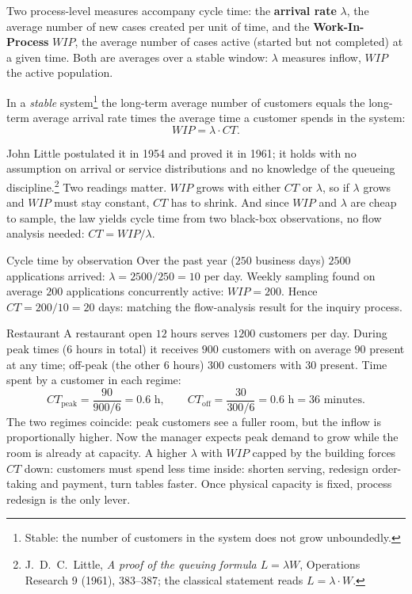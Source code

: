 Two process-level measures accompany cycle time: the \textbf{arrival rate} $\lambda$, the average number of new cases created per unit of time, and the \textbf{Work-In-Process} $WIP$, the average number of cases active (started but not completed) at a given time. Both are averages over a stable window: $\lambda$ measures inflow, $WIP$ the active population.
\begin{theorem}
In a \emph{stable} system\footnote{Stable: the number of customers in the system does not grow unboundedly.} the long-term average number of customers equals the long-term average arrival rate times the average time a customer spends in the system:
\[WIP = \lambda \cdot CT.\]
\end{theorem}
John Little postulated it in 1954 and proved it in 1961; it holds with no assumption on arrival or service distributions and no knowledge of the queueing discipline.\footnote{J.~D.~C.~Little, \emph{A proof of the queuing formula $L = \lambda W$}, Operations Research 9 (1961), 383--387; the classical statement reads $L = \lambda \cdot W$.} Two readings matter. $WIP$ grows with either $CT$ or $\lambda$, so if $\lambda$ grows and $WIP$ must stay constant, $CT$ has to shrink. And since $WIP$ and $\lambda$ are cheap to sample, the law yields cycle time from two black-box observations, no flow analysis needed: $CT = WIP / \lambda$.
\begin{examplebox}{Cycle time by observation}
Over the past year ($250$ business days) $2500$ applications arrived: $\lambda = 2500/250 = 10$ per day. Weekly sampling found on average $200$ applications concurrently active: $WIP = 200$. Hence $CT = 200/10 = 20$ days: matching the flow-analysis result for the inquiry process.
\end{examplebox}
\begin{examplebox}{Restaurant}
A restaurant open $12$ hours serves $1200$ customers per day. During peak times ($6$ hours in total) it receives $900$ customers with on average $90$ present at any time; off-peak (the other $6$ hours) $300$ customers with $30$ present. Time spent by a customer in each regime:
\[CT_{\text{peak}} = \frac{90}{900/6} = 0.6 \text{ h}, \qquad CT_{\text{off}} = \frac{30}{300/6} = 0.6 \text{ h} = 36 \text{ minutes}.\]
The two regimes coincide: peak customers see a fuller room, but the inflow is proportionally higher. Now the manager expects peak demand to grow while the room is already at capacity. A higher $\lambda$ with $WIP$ capped by the building forces $CT$ down: customers must spend less time inside: shorten serving, redesign order-taking and payment, turn tables faster. Once physical capacity is fixed, process redesign is the only lever.
\end{examplebox}

